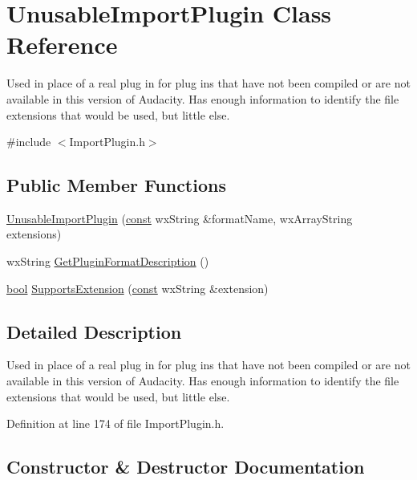 \hypertarget{class_unusable_import_plugin}{}\section{Unusable\+Import\+Plugin Class Reference}
\label{class_unusable_import_plugin}


Used in place of a real plug in for plug ins that have not been compiled or are not available in this version of Audacity. Has enough information to identify the file extensions that would be used, but little else.  




{\ttfamily \#include $<$Import\+Plugin.\+h$>$}

\subsection*{Public Member Functions}
\begin{DoxyCompactItemize}
\item 
\hyperlink{class_unusable_import_plugin_a188596b733a239f5f9f95704f1f15800}{Unusable\+Import\+Plugin} (\hyperlink{getopt1_8c_a2c212835823e3c54a8ab6d95c652660e}{const} wx\+String \&format\+Name, wx\+Array\+String extensions)
\item 
wx\+String \hyperlink{class_unusable_import_plugin_a7622b716a604a1e8853b2976f1e6bb01}{Get\+Plugin\+Format\+Description} ()
\item 
\hyperlink{mac_2config_2i386_2lib-src_2libsoxr_2soxr-config_8h_abb452686968e48b67397da5f97445f5b}{bool} \hyperlink{class_unusable_import_plugin_aefb06c6f229ba983b832edaffabcf796}{Supports\+Extension} (\hyperlink{getopt1_8c_a2c212835823e3c54a8ab6d95c652660e}{const} wx\+String \&extension)
\end{DoxyCompactItemize}


\subsection{Detailed Description}
Used in place of a real plug in for plug ins that have not been compiled or are not available in this version of Audacity. Has enough information to identify the file extensions that would be used, but little else. 

Definition at line 174 of file Import\+Plugin.\+h.



\subsection{Constructor \& Destructor Documentation}

